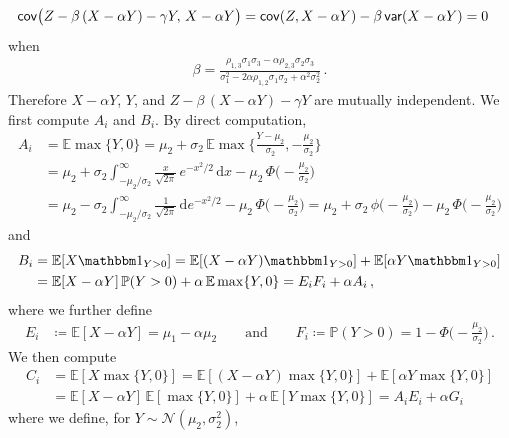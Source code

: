 \documentclass{custom}
\begin{document}
\begin{align*}
\mathsf{cov}\bigl(Z-\beta\,(X-\alpha Y)-\gamma Y,\,X-\alpha Y\bigr) & =\mathsf{cov}(Z,X-\alpha Y)-\beta\operatorname{\mathsf{var}}(X-\alpha Y)=0
\end{align*}
when
\begin{align*}
\beta=\frac{\rho_{1,3}\sigma_{1}\sigma_{3}-\alpha\rho_{2,3}\sigma_{2}\sigma_{3}}{\sigma_{1}^{2}-2\alpha\rho_{1,2}\sigma_{1}\sigma_{2}+\alpha^{2}\sigma_{2}^{2}}\,.
\end{align*}
Therefore $X-\alpha Y$, $Y$, and $Z-\beta\,(X-\alpha Y)-\gamma Y$
are mutually independent. We first compute $A_{i}$ and $B_{i}$.
By direct computation,
\begin{align*}
A_{i} & =\mathbb{E} \max\{ Y,0\} =\mu_{2}+\sigma_{2}\,\mathbb{E}\max\bigl\{ \frac{Y-\mu_{2}}{\sigma_{2}},-\frac{\mu_{2}}{\sigma_{2}}\bigr\} \\
&=\mu_{2}+\sigma_{2}\int_{-\mu_{2}/\sigma_{2}}^{\infty}\frac{x}{\sqrt{2\pi}}\,e^{-x^{2}/2}\,\mathrm{d}x-\mu_{2}\,\Phi\bigl(-\frac{\mu_{2}}{\sigma_{2}}\bigr)\\
 & =\mu_{2}-\sigma_{2}\int_{-\mu_{2}/\sigma_{2}}^{\infty}\frac{1}{\sqrt{2\pi}}\,\mathrm{d}e^{-x^{2}/2}-\mu_{2}\,\Phi\bigl(-\frac{\mu_{2}}{\sigma_{2}}\bigr)
 =\mu_{2}+\sigma_{2}\,\phi\bigl(-\frac{\mu_{2}}{\sigma_{2}}\bigr)-\mu_{2}\,\Phi\bigl(-\frac{\mu_{2}}{\sigma_{2}}\bigr)
\end{align*}
and
\begin{align*}
B_{i} & =\mathbb{E}[X\ind_{Y>0}]=\mathbb{E}[(X-\alpha Y)\ind_{Y>0}]+\mathbb{E}[\alpha Y\ind_{Y>0}]\\
 & =\mathbb{E}[X-\alpha Y]\,\mathbb{P}(Y>0)+\alpha\,\mathbb{E}\max\{ Y,0\} =E_{i}F_{i}+\alpha A_{i}\,,
\end{align*}
where we further define
\begin{align*}
E_{i} & \coloneqq\mathbb{E}[X-\alpha Y]=\mu_{1}-\alpha\mu_{2}\qquad\text{and}\qquad F_{i}\coloneqq\mathbb{P}(Y>0)=1-\Phi\bigl(-\frac{\mu_{2}}{\sigma_{2}}\bigr)\,.
\end{align*}
We then compute
\begin{align*}
C_{i} & =\mathbb{E}[X\max\{ Y,0\}]
=\mathbb{E}[(X-\alpha Y)\max\{ Y,0\} ]+\mathbb{E}[\alpha Y\max\{ Y,0\} ]\\
 & =\mathbb{E}[X-\alpha Y]\,\mathbb{E}[\max\{ Y,0\} ]+\alpha\,\mathbb{E}[Y\max\{ Y,0\} ]
= A_i E_{i}+\alpha G_{i}
\end{align*}
where we define, for $Y\sim\mathcal{N}(\mu_{2},\sigma_{2}^{2})$,
\end{document}

